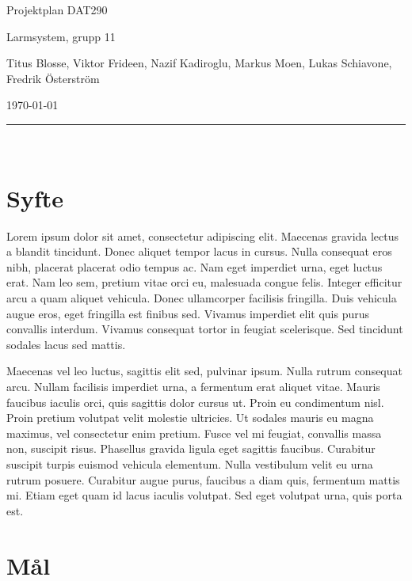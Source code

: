 \documentclass{article}
\begin{document}
\begin{center}
\thispagestyle{empty}
\parskip=14pt%
\vspace*{3\parskip}%

{\LARGE Projektplan DAT290}

{\large Larmsystem, grupp 11

Titus Blosse, Viktor Frideen, Nazif Kadiroglu, Markus Moen, Lukas Schiavone, Fredrik Österström

\today}


\rule{7cm}{0.4pt}\\
\end{center}
\newpage

\thispagestyle{empty}
\tableofcontents
\newpage


\section{Syfte}
Lorem ipsum dolor sit amet, consectetur adipiscing elit. Maecenas gravida lectus a blandit tincidunt. Donec aliquet tempor lacus in cursus. Nulla consequat eros nibh, placerat placerat odio tempus ac. Nam eget imperdiet urna, eget luctus erat. Nam leo sem, pretium vitae orci eu, malesuada congue felis. Integer efficitur arcu a quam aliquet vehicula. Donec ullamcorper facilisis fringilla. Duis vehicula augue eros, eget fringilla est finibus sed. Vivamus imperdiet elit quis purus convallis interdum. Vivamus consequat tortor in feugiat scelerisque. Sed tincidunt sodales lacus sed mattis.\par
Maecenas vel leo luctus, sagittis elit sed, pulvinar ipsum. Nulla rutrum consequat arcu. Nullam facilisis imperdiet urna, a fermentum erat aliquet vitae. Mauris faucibus iaculis orci, quis sagittis dolor cursus ut. Proin eu condimentum nisl. Proin pretium volutpat velit molestie ultricies. Ut sodales mauris eu magna maximus, vel consectetur enim pretium. Fusce vel mi feugiat, convallis massa non, suscipit risus. Phasellus gravida ligula eget sagittis faucibus. Curabitur suscipit turpis euismod vehicula elementum. Nulla vestibulum velit eu urna rutrum posuere. Curabitur augue purus, faucibus a diam quis, fermentum mattis mi. Etiam eget quam id lacus iaculis volutpat. Sed eget volutpat urna, quis porta est.

\section{Mål}
\end{document}
